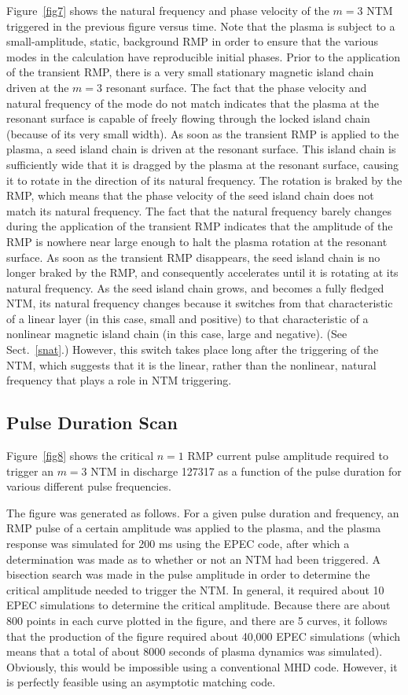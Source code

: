\documentclass[12pt,prb,aps]{revtex4-1}
\begin{document}
Figure~\ref{fig7} shows the natural frequency and phase velocity of the $m=3$ NTM triggered in the previous figure  versus time. Note that the plasma is subject to a small-amplitude, static, background RMP in order to ensure 
that the various modes in the calculation have reproducible initial phases. Prior to the application of the transient
RMP, there is a very small stationary magnetic island chain driven at the $m=3$ resonant surface. The fact that the
phase velocity and natural frequency of the mode do not match  indicates that the plasma at the
resonant surface is capable of freely flowing through the locked island chain (because of its very small width). As soon as the transient RMP is applied to the plasma, a seed island chain is driven at the resonant surface. This island chain is
sufficiently wide that it is dragged by the plasma at the resonant surface, causing it to rotate in the direction of its 
natural frequency. The rotation is braked by the RMP, which means that the phase velocity of the seed island chain does not
match its natural frequency. 
The fact that the natural frequency barely changes during the application of the transient RMP
indicates that the amplitude of the RMP is nowhere near large enough to halt the plasma rotation at the resonant surface. As soon as the transient RMP disappears, the seed island chain is no longer braked by the RMP, and
consequently accelerates until it is rotating at its natural frequency. As the seed island chain grows, and becomes a fully fledged NTM, its natural frequency changes because it switches from that characteristic of a linear layer (in this case, small and positive) to that characteristic of a nonlinear magnetic island chain (in this case, large and negative). (See Sect.~\ref{snat}.) However, this switch takes place long after the triggering of the NTM, which suggests that it is
the linear, rather than the nonlinear, natural frequency that plays a role in NTM triggering. 

\subsection{Pulse Duration Scan}
Figure~\ref{fig8} shows the critical $n=1$ RMP current  pulse amplitude required to trigger an $m=3$ NTM in discharge 127317 as a
function of the pulse duration for various different pulse frequencies. 

The figure was generated as follows.
For a given pulse duration and frequency, an RMP pulse of a certain amplitude was applied to the plasma, and the plasma response was simulated for 200 ms using the EPEC code, after which a determination was made as to whether or not an NTM had
been triggered. A bisection search was made in the
pulse amplitude in order to determine the critical amplitude needed to trigger the NTM. In general, it required about 10
EPEC simulations to determine the critical amplitude. Because there are about 800 points in each curve plotted in the figure, and there are 5 curves, it follows that the production of the figure required about 40,000 EPEC simulations (which means that
a total of about  8000 seconds of plasma dynamics was simulated). Obviously, this would be impossible using a
conventional MHD code. However, it is perfectly feasible using an asymptotic matching code. 
\end{document}

